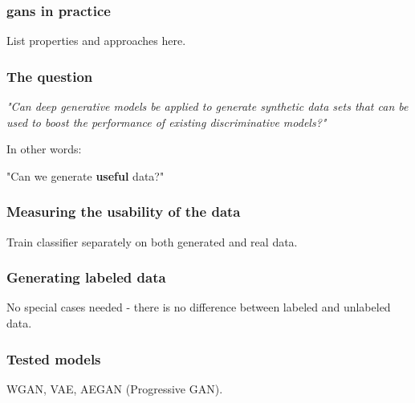 \documentclass{beamer}
\begin{document}
\begin{messageframe}
    \frametitle{\acrshort{gans} in practice}
    List properties and approaches here.
\end{messageframe}


\begin{messageframe}
    \frametitle{The question}
    \textit{"Can deep generative models be applied to generate synthetic data sets that can be used to boost the performance of existing discriminative models?"}
    
    \vspace{1.5cm}
    
    In other words:

    "Can we generate \textbf{useful} data?"
\end{messageframe}

\begin{messageframe}
    \frametitle{Measuring the usability of the data}
    Train classifier separately on both generated and real data.
\end{messageframe}

\begin{messageframe}
    \frametitle{Generating labeled data}
    No special cases needed - there is no difference between labeled and unlabeled data.
\end{messageframe}


\begin{messageframe}
    \frametitle{Tested models}
    WGAN, VAE, AEGAN (Progressive GAN).
\end{messageframe}



\end{document}
